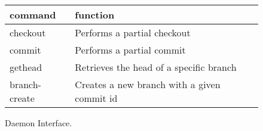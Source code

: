 \begin{figure}[htb]
\centering
{\footnotesize
\begin{tabular}{@{} p{1.0in} p{1.0in} @{} }

\toprule

\textbf{command} & \textbf{function} \\

\midrule

checkout & Performs a partial checkout \\
commit & Performs a partial commit \\
gethead & Retrieves the head of a specific branch \\
branch-create & Creates a new branch with a given commit id \\

\bottomrule

\end{tabular}
}
\caption{\Sys Daemon Interface. }
\label{f:command-daemon}
\end{figure}

\endinput

